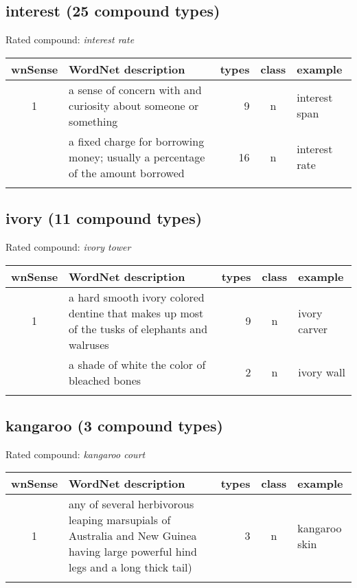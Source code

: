 \subsection{interest     (25 compound types)}
Rated compound: \emph{interest rate}


\noindent
\begin{longtable}{c>{\raggedright\arraybackslash}p{5cm}rc>{\raggedright\arraybackslash}p{2cm}}\lsptoprule
{\small wnSense}&WordNet description&types&class&example\\\midrule
1&a sense of concern with and curiosity about someone or something&9&n&interest span\\\tablevspace
4&a fixed charge for borrowing money; usually a percentage of the amount borrowed&16&n&interest rate\\\lspbottomrule
\end{longtable}

\subsection{ivory        (11 compound types)}
Rated compound: \emph{ivory tower}


\noindent
\begin{longtable}{c>{\raggedright\arraybackslash}p{5cm}rc>{\raggedright\arraybackslash}p{2cm}}\lsptoprule
{\small wnSense}&WordNet description&types&class&example\\\midrule
1&a hard smooth ivory colored dentine that makes up most of the tusks of elephants and walruses&9&n&ivory carver\\\tablevspace
2&a shade of white the color of bleached bones&2&n&ivory wall\\\lspbottomrule
\end{longtable}

\subsection{kangaroo     (3 compound types)}
Rated compound: \emph{kangaroo court}


\noindent
\begin{longtable}{c>{\raggedright\arraybackslash}p{5cm}rc>{\raggedright\arraybackslash}p{2cm}}\lsptoprule
{\small wnSense}&WordNet description&types&class&example\\\midrule
1&any of several herbivorous leaping marsupials of Australia and New Guinea having large powerful hind legs and a long thick tail)&3&n&kangaroo skin\\\lspbottomrule
\end{longtable}

